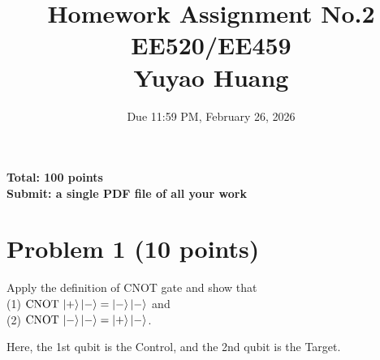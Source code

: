 \documentclass[11pt]{article}
\title{Homework Assignment No.2 \\ EE520/EE459 \\ Yuyao Huang}
\date{Due 11:59 PM, February 26, 2026}
\begin{document}
\maketitle

\textbf{Total: 100 points} \\
\textbf{Submit: a single PDF file of all your work}

\section*{Problem 1 (10 points)}

Apply the definition of CNOT gate and show that \\
(1) $\operatorname{CNOT} \, \ket{+}\ket{-} = \ket{-}\ket{-}$ and \\
(2) $\operatorname{CNOT} \, \ket{-}\ket{-} = \ket{+}\ket{-}$.

Here, the 1st qubit is the Control, and the 2nd qubit is the Target.
\end{document}
